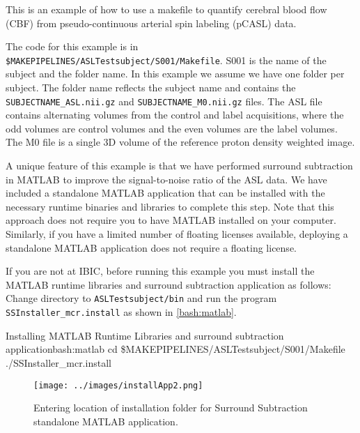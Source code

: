 \label{chap:asl}
This is an example
of how to use a makefile to quantify cerebral blood flow (CBF) from
pseudo-continuous arterial spin labeling (pCASL) data. 

The code for this example is in
\texttt{\$MAKEPIPELINES/ASLTestsubject/S001/Makefile}. S001 is the
name of the subject and the folder name. In this example 
we assume we have one folder per subject. The folder name
reflects the subject name and contains the
\texttt{SUBJECTNAME_ASL.nii.gz} and \texttt{SUBJECTNAME_M0.nii.gz}
files. The ASL file contains alternating volumes from the control and
label acquisitions, where the odd volumes are control volumes and the even
volumes are the label volumes. The M0 file is a single 3D volume of
the reference proton density weighted image.

A unique feature of this example is that we have
performed surround subtraction in MATLAB to improve the 
signal-to-noise ratio of the ASL data.  We have included a standalone 
MATLAB application that can be installed with the necessary runtime binaries 
and libraries to complete this step. Note that this approach does not  
require you to have MATLAB installed on your computer. Similarly, if
you have a limited number of floating licenses available, deploying a
standalone MATLAB application does not require a floating license. 

If you are not at IBIC, before running this example you must install
the MATLAB runtime libraries and surround subtraction application as follows:
\\
Change directory to \texttt{ASLTestsubject/bin} and run the program
\texttt{SSInstaller_mcr.install} as shown in \autoref{bash:matlab}.
\begin{bash}{Installing MATLAB Runtime Libraries and surround
    subtraction application}{bash:matlab}
cd \$MAKEPIPELINES/ASLTestsubject/S001/Makefile\\
./SSInstaller_mcr.install
\end{bash}

\begin{figure}
\begin{center}
  \texttt{[image: ../images/installApp2.png]}
\caption{Entering location of installation folder for Surround 
  Subtraction standalone MATLAB application.}
\label{fig:ssinstall2}
\end{center}
\end{figure}

